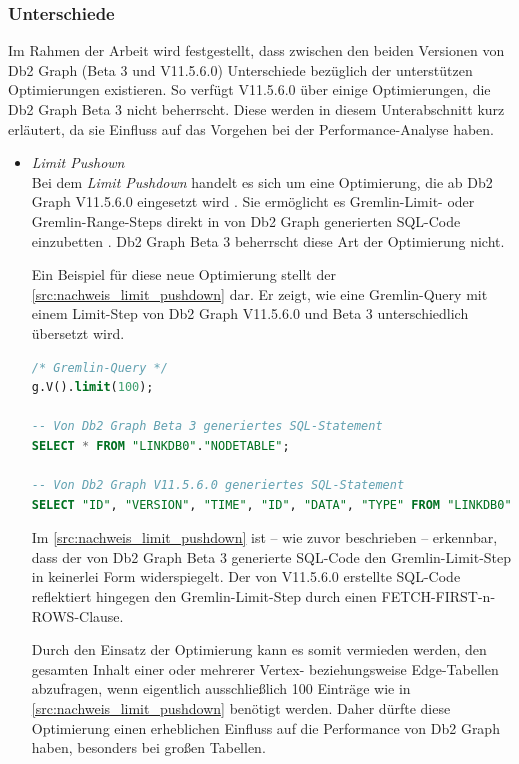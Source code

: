 \subsubsection{Unterschiede}
Im Rahmen der Arbeit wird festgestellt, dass zwischen den beiden Versionen von Db2 Graph (Beta 3 und V11.5.6.0) Unterschiede bezüglich der unterstützen Optimierungen existieren. So verfügt V11.5.6.0 über einige Optimierungen, die Db2 Graph Beta 3 nicht beherrscht. Diese werden in diesem Unterabschnitt kurz erläutert, da sie Einfluss auf das Vorgehen bei der Performance-Analyse haben. 
\begin{itemize}
    \item \textit{Limit Pushown}\\
    Bei dem \textit{Limit Pushdown} handelt es sich um eine Optimierung, die ab Db2 Graph V11.5.6.0 eingesetzt wird \cite{ibm_docs_optimize}. Sie ermöglicht es Gremlin-Limit- oder Gremlin-Range-Steps direkt in von Db2 Graph generierten SQL-Code einzubetten \cite{ibm_docs_optimize}. Db2 Graph Beta 3 beherrscht diese Art der Optimierung nicht.

    Ein Beispiel für diese neue Optimierung stellt der \autoref{src:nachweis_limit_pushdown} dar. Er zeigt, wie eine Gremlin-Query mit einem Limit-Step von Db2 Graph V11.5.6.0 und Beta 3 unterschiedlich übersetzt wird.

\begin{lstlisting}[label=src:nachweis_limit_pushdown,caption={Nachweis Limit Pushdown Optimierung},language=SQL]
/* Gremlin-Query */
g.V().limit(100);

-- Von Db2 Graph Beta 3 generiertes SQL-Statement
SELECT * FROM "LINKDB0"."NODETABLE";

-- Von Db2 Graph V11.5.6.0 generiertes SQL-Statement
SELECT "ID", "VERSION", "TIME", "ID", "DATA", "TYPE" FROM "LINKDB0"."NODETABLE" FETCH FIRST 100 ROWS;
\end{lstlisting}

    Im \autoref{src:nachweis_limit_pushdown} ist -- wie zuvor beschrieben -- erkennbar, dass der von Db2 Graph Beta 3 generierte SQL-Code den Gremlin-Limit-Step in keinerlei Form widerspiegelt. Der von V11.5.6.0 erstellte SQL-Code reflektiert hingegen den Gremlin-Limit-Step durch einen FETCH-FIRST-n-ROWS-Clause.

    Durch den Einsatz der Optimierung kann es somit vermieden werden, den gesamten Inhalt einer oder mehrerer Vertex- beziehungsweise Edge-Tabellen abzufragen, wenn eigentlich ausschließlich 100 Einträge wie in \autoref{src:nachweis_limit_pushdown} benötigt werden. Daher dürfte diese Optimierung einen erheblichen Einfluss auf die Performance von Db2 Graph haben, besonders bei großen Tabellen.


\end{itemize}
